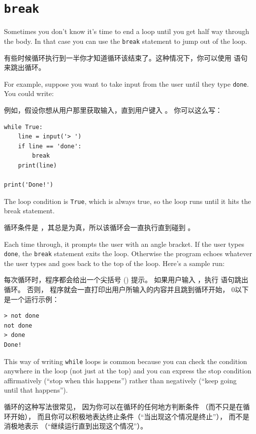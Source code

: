 \section{{\tt break} }
  

Sometimes you don't know it's time to end a loop until you get half
way through the body.  In that case you can use the {\tt break}
statement to jump out of the loop.

有些时候循环执行到一半你才知道循环该结束了。这种情况下，你可以使用  语句来跳出循环。

For example, suppose you want to take input from the user until they
type {\tt done}.  You could write:

例如，假设你想从用户那里获取输入，直到用户键入 。 你可以这么写：


\begin{lstlisting}
while True:
    line = input('> ')
    if line == 'done':
        break
    print(line)

print('Done!')
\end{lstlisting}

%
The loop condition is {\tt True}, which is always true, so the
loop runs until it hits the break statement.

循环条件是 ，其总是为真，所以该循环会一直执行直到碰到 。

Each time through, it prompts the user with an angle bracket.
If the user types {\tt done}, the {\tt break} statement exits
the loop.  Otherwise the program echoes whatever the user types
and goes back to the top of the loop.  Here's a sample run:

每次循环时，程序都会给出一个尖括号 (\li{>}) 提示。 如果用户输入 ，执行  语句跳出循环。 否则， 程序就会一直打印出用户所输入的内容并且跳到循环开始， 0以下是一个运行示例：


\begin{lstlisting}
> not done
not done
> done
Done!
\end{lstlisting}

%
This way of writing {\tt while} loops is common because you
can check the condition anywhere in the loop (not just at the
top) and you can express the stop condition affirmatively
(``stop when this happens'') rather than negatively (``keep going
until that happens'').

 循环的这种写法很常见， 因为你可以在循环的任何地方判断条件
（而不只是在循环开始）， 而且你可以积极地表达终止条件（``当出现这个情况是终止''）， 而不是消极地表示 （``继续运行直到出现这个情况''）。



